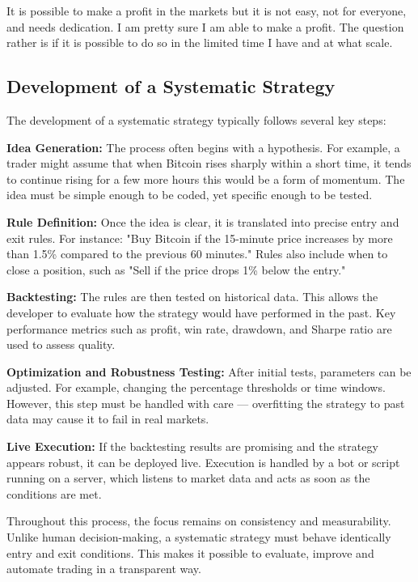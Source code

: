 \documentclass[12pt]{article}
\begin{document}
It is possible to make a profit in the markets but it is not easy, not for everyone, and needs dedication. I am pretty sure I am able to make a profit. The question rather is if it is possible to do so in the limited time I have and at what scale.


\newpage

\subsection{Development of a Systematic Strategy}


The development of a systematic strategy typically follows several key steps:

\textbf{Idea Generation:}
The process often begins with a hypothesis. For example, a trader might assume that when Bitcoin rises sharply within a short time, it tends to continue rising for a few more hours this would be a form of momentum. The idea must be simple enough to be coded, yet specific enough to be tested.

\textbf{Rule Definition:}
Once the idea is clear, it is translated into precise entry and exit rules. For instance: "Buy Bitcoin if the 15-minute price increases by more than 1.5\% compared to the previous 60 minutes." Rules also include when to close a position, such as "Sell if the price drops 1\% below the entry."

\textbf{Backtesting:}
The rules are then tested on historical data. This allows the developer to evaluate how the strategy would have performed in the past. Key performance metrics such as profit, win rate, drawdown, and Sharpe ratio are used to assess quality.

\textbf{Optimization and Robustness Testing:}
After initial tests, parameters can be adjusted. For example, changing the percentage thresholds or time windows. However, this step must be handled with care — overfitting the strategy to past data may cause it to fail in real markets.

\textbf{Live Execution:}
If the backtesting results are promising and the strategy appears robust, it can be deployed live. Execution is handled by a bot or script running on a server, which listens to market data and acts as soon as the conditions are met.

Throughout this process, the focus remains on consistency and measurability. Unlike human decision-making, a systematic strategy must behave identically entry and exit conditions. This makes it possible to evaluate, improve and automate trading in a transparent way.
\end{document}
